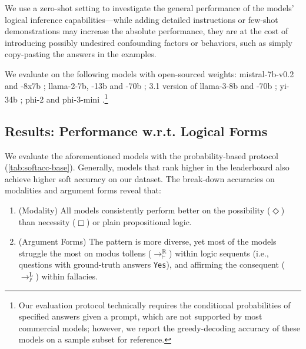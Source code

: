\noindent We use a zero-shot setting to investigate the general performance of the models' logical inference capabilities---while adding detailed instructions or few-shot demonstrations may increase the absolute performance, they are at the cost of introducing possibly undesired confounding factors or behaviors, such as simply copy-pasting the answers in the examples.

We evaluate on the following models with open-sourced weights: mistral-7b-v0.2 and -8x7b \citep{jiangMistral7B2023a, jiangMixtralExperts2024};
llama-2-7b, -13b and -70b \citep{touvronLlamaOpenFoundation2023};
3.1 version of llama-3-8b and -70b \citep{metaLlamaHerdModels2024};
yi-34b \citep{yiOpenFoundation2024};
phi-2 and phi-3-mini \citep{javaheripiPhi2023, abdinPhi3TechnicalReport2024}.\footnote{
    Our evaluation protocol technically requires the conditional probabilities of specified answers given a prompt, which are not supported by most commercial models; however, we report the greedy-decoding accuracy of these models on a sample subset for reference.
}

\subsection{Results: Performance w.r.t. Logical Forms}
We evaluate the aforementioned models with the probability-based protocol (\cref{tab:softacc-base}).
Generally, models that rank higher in the leaderboard also achieve higher soft accuracy on our dataset.
The break-down accuracies on modalities and argument forms reveal that:

\begin{enumerate}[leftmargin=*,itemsep=0pt,topsep=2pt]
    \item (Modality) All models consistently perform better on the possibility ($\Diamond$) than necessity ($\Box$) or plain propositional logic.
    \item (Argument Forms) The pattern is more diverse, yet most of the models struggle the most on modus tollens ($\to^\mathrm{R}_\vdash$) within logic sequents (i.e., questions with ground-truth answers \texttt{Yes}), and affirming the consequent ($\to^\mathrm{L}_\nvdash$) within fallacies.
\end{enumerate}


